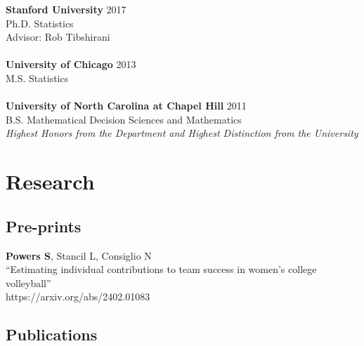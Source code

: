 \documentclass{article}
\begin{document}
{\bf Stanford University} \hfill 2017\\
Ph.D. Statistics\\
Advisor: Rob Tibshirani\\
~\\
{\bf University of Chicago} \hfill 2013\\
M.S. Statistics\\
~\\
{\bf University of North Carolina at Chapel Hill} \hfill 2011\\
B.S. Mathematical Decision Sciences and Mathematics\\
{\it Highest Honors from the Department and Highest Distinction from the University}


\section*{\sc Research}

\subsection*{\sc Pre-prints}

{\bf Powers S}, Stancil L, Consiglio N\\
``Estimating individual contributions to team success in women's college volleyball''\\
https://arxiv.org/abs/2402.01083

\subsection*{\sc Publications}
\end{document}
